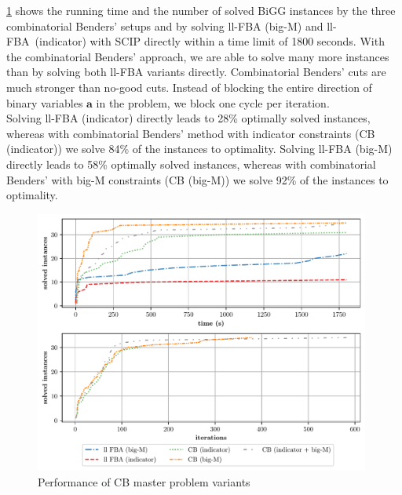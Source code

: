 \newpage
\cref{fig:comparison_solved_instances_indicator_and_big_m_as_MP} shows the running time and the number of solved BiGG instances by the three combinatorial Benders' setups and by solving \textsf{ll-FBA (big-M)} and \mbox{\textsf{ll-FBA (indicator)}} with \textsf{SCIP} directly within a time limit of 1800 seconds. 
With the combinatorial Benders' approach, we are able to solve many more instances than by solving both ll-FBA variants directly. Combinatorial Benders' cuts are much stronger than no-good cuts. Instead of blocking the entire direction of binary variables $\boldsymbol a$ in the problem, we block one cycle per iteration. \\
Solving \textsf{ll-FBA (indicator)} directly leads to 28\% optimally solved instances, whereas with combinatorial Benders' method with indicator constraints (\textsf{CB (indicator)}) we solve 84\% of the instances to optimality. Solving \textsf{ll-FBA (big-M)} directly leads to 58\% optimally solved instances, whereas with combinatorial Benders' with big-M constraints (\textsf{CB (big-M)}) we solve 92\% of the instances to optimality. %

\begin{figure}[h!]
    \centering
    \includegraphics[width=0.983\textwidth]{Images/comparison_solved_instances_indicator_and_big_m.pdf}
    \caption{Performance of CB master problem variants}
    \label{fig:comparison_solved_instances_indicator_and_big_m_as_MP}
\end{figure}

